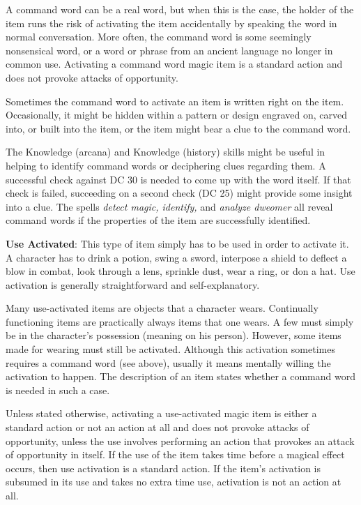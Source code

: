 A command word can be a real word, but when this is the case, the holder of the item runs the risk of activating the item accidentally by speaking the word in normal conversation. More often, the command word is some seemingly nonsensical word, or a word or phrase from an ancient language no longer in common use. Activating a command word magic item is a standard action and does not provoke attacks of opportunity.
				
Sometimes the command word to activate an item is written right on the item. Occasionally, it might be hidden within a pattern or design engraved on, carved into, or built into the item, or the item might bear a clue to the command word.
				
The Knowledge (arcana) and Knowledge (history) skills might be useful in helping to identify command words or deciphering clues regarding them. A successful check against DC 30 is needed to come up with the word itself. If that check is failed, succeeding on a second check (DC 25) might provide some insight into a clue. The spells \textit{detect magic, identify, }and \textit{analyze dweomer }all reveal command words if the properties of the item are successfully identified.
				
\textbf{Use Activated}: This type of item simply has to be used in order to activate it. A character has to drink a potion, swing a sword, interpose a shield to deflect a blow in combat, look through a lens, sprinkle dust, wear a ring, or don a hat. Use activation is generally straightforward and self-explanatory.
				
Many use-activated items are objects that a character wears. Continually functioning items are practically always items that one wears. A few must simply be in the character's possession (meaning on his person). However, some items made for wearing must still be activated. Although this activation sometimes requires a command word (see above), usually it means mentally willing the activation to happen. The description of an item states whether a command word is needed in such a case.
				
Unless stated otherwise, activating a use-activated magic item is either a standard action or not an action at all and does not provoke attacks of opportunity, unless the use involves performing an action that provokes an attack of opportunity in itself. If the use of the item takes time before a magical effect occurs, then use activation is a standard action. If the item's activation is subsumed in its use and takes no extra time use, activation is not an action at all.
				
